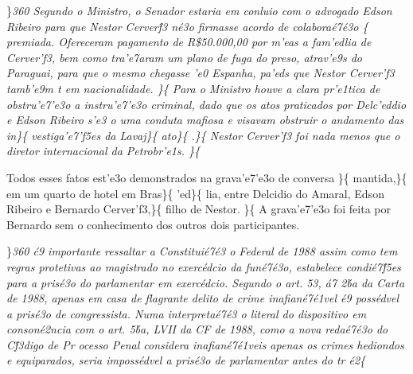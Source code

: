  \ltrch{} 
\par \}\pard \ltrpar\qj {}\sl360\widctlpar\wrapdefault\aspalpha\aspnum\faauto\adjustright{} {\rtlch{}  \ltrch{}  
Segundo o Ministro, o Senador estaria em conluio com o advogado Edson Ribeiro para que Nestor Cerver\'f3 n\'e3o firmasse acordo de colabora\'e7\'e3o }\{\rtlch{}
 \ltrch{}  premiada. Ofereceram
pagamento de R\$50.000,00 por m'eas a fam'edlia de Cerver'f3, bem como
tra'e7aram um plano de fuga do preso, atrav'e9s do Paraguai, para que o
mesmo chegasse 'e0 Espanha, pa'eds que Nestor Cerver'f3 tamb'e9m t em
nacionalidade. \}\{\rtlch{}  \ltrch{}
 Para o Ministro houve a clara pr'e1tica
de obstru'e7'e3o a instru'e7'e3o criminal, dado que os atos praticados
por Delc'eddio e Edson Ribeiro s'e3 o uma conduta mafiosa e visavam
obstruir o andamento das in\}\{\rtlch{}  \ltrch{}
 vestiga'e7'f5es da Lavaj\}\{\rtlch{}  \ltrch{}
 ato\}\{\rtlch{}  \ltrch{}
 .\}\{ \rtlch{}  \ltrch{}
 Nestor Cerver'f3 foi nada menos que o
diretor internacional da Petrobr'e1s. \}\{\rtlch{}  \ltrch{}
 \par Todos esses fatos est'e3o
demonstrados na grava'e7'e3o de conversa \}\{\rtlch{} 
\ltrch{}  mantida,\}\{\rtlch{}  \ltrch{}
 em um quarto de hotel em
Bras\}\{\rtlch{}  \ltrch{}  'ed\}\{\rtlch{}
 \ltrch{}  lia, entre Delcidio do
Amaral, Edson Ribeiro e Bernardo Cerver'f3,\}\{\rtlch{} 
\ltrch{}  filho de Nestor.
\}\{\rtlch{}  \ltrch{}  A
grava'e7'e3o foi feita por Bernardo sem o conhecimento dos outros dois
participantes.
\par \}\pard \ltrpar\qj {}\sl360\widctlpar\wrapdefault\aspalpha\aspnum\faauto\adjustright{} {\rtlch{}  \ltrch{}  \'c9 importante ressaltar a Constitui\'e7\'e3
o Federal de 1988 assim como tem regras protetivas ao magistrado no exerc\'edcio da fun\'e7\'e3o, estabelece condi\'e7\'f5es para a pris\'e3o do parlamentar em exerc\'edcio. Segundo o art.}{\rtlch{}  \ltrch{}  
53, \'a7}{\rtlch{}  \ltrch{}  2\'ba da Carta de 1988, apenas em casa de flagrante delito de crime inafian\'e7\'e1vel \'e9 poss\'edvel a pris\'e3o de congressista. Numa interpreta\'e7\'e3
o literal do dispositivo em conson\'e2ncia com o art. 5\'ba, LVII da CF de 1988, }{\rtlch{}  \ltrch{}  como}{\rtlch{}  \ltrch{}   a nova reda\'e7\'e3o do C\'f3digo de Pr
ocesso Penal considera inafian\'e7\'e1veis apenas os crimes hediondos e equiparados, seria imposs\'edvel a pris\'e3o de parlamentar antes do tr}{\rtlch{}  \ltrch{}  \'e2}\{\rtlch{}
